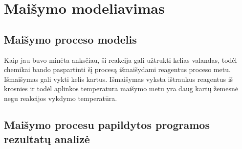 
\section{Maišymo modeliavimas}
\subsection{Maišymo proceso modelis}

Kaip jau buvo minėta anksčiau, ši reakcija gali užtrukti kelias valandas, todėl chemikai bando paspartinti šį procesą išmaišydami reagentus proceso metu. Išmaišymas gali vykti kelis kartus. Išmaišymas vyksta ištraukus reagentus iš krosnies ir todėl aplinkos temperatūra maišymo metu yra daug kartų žemesnė negu reakcijos vykdymo temperatūra.



\subsection{Maišymo procesu papildytos programos rezultatų analizė}

